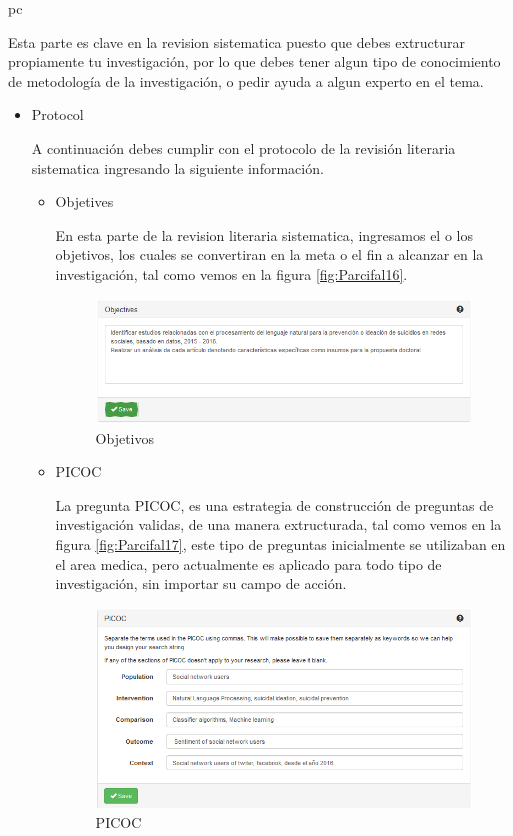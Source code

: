 pc\documentclass[a4paper,12pt,openany]{book}
\begin{document}
\begin{itemize}
Esta parte es clave en la revision sistematica puesto que debes extructurar propiamente tu investigación, por lo que debes tener algun tipo de conocimiento de metodología de la investigación, o pedir ayuda a algun experto en el tema.

\begin{itemize}
\item Protocol

A continuación debes cumplir con el protocolo de la revisión literaria sistematica ingresando la siguiente información. 

\begin{itemize}
\item Objetives

En esta parte de la revision literaria sistematica, ingresamos el o los objetivos, los cuales se convertiran en la meta o el fin a alcanzar en la investigación, tal como vemos en la figura \ref{fig:Parcifal16}.

    \begin{figure}[H]
    \centering
	\includegraphics[width=12cm]{parsifal6.png}
    \caption{Objetivos}
    \label{fig:Parcifal6}
    \end{figure}

\item PICOC

La pregunta PICOC, es una estrategia de construcción de preguntas de investigación validas, de una manera extructurada, tal como vemos en la figura \ref{fig:Parcifal17}, este tipo de preguntas inicialmente se utilizaban en el area medica, pero actualmente es aplicado para todo tipo de investigación, sin importar su campo de acción.

    \begin{figure}[H]
    \centering
	\includegraphics[width=12cm]{parsifal7.png}
    \caption{PICOC}
    \label{fig:Parcifal7}
    \end{figure}


\end{itemize}
\end{itemize}
\end{itemize}
\end{document}
